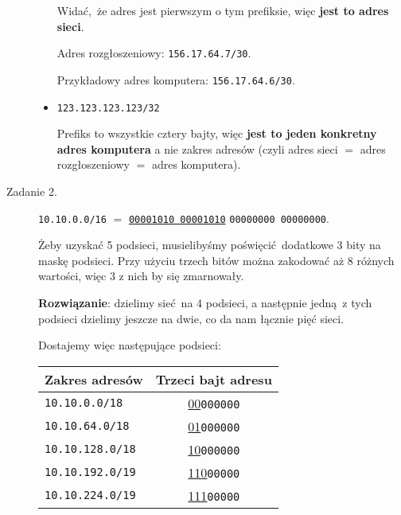 \documentclass[a4paper, oneside]{article}
\begin{document}
\begin{description}
\begin{itemize}
{            Widać, że adres jest pierwszym o tym prefiksie, więc 
            \textbf{jest to adres sieci}.

            Adres rozgłoszeniowy: \texttt{156.17.64.7/30}.

            Przykładowy adres komputera: \texttt{156.17.64.6/30}.
        }

        \item {
            \texttt{123.123.123.123/32}

            Prefiks to wszystkie cztery bajty, więc 
            \textbf{jest to jeden konkretny adres komputera} a nie zakres 
            adresów (czyli adres sieci $=$ adres rozgłoszeniowy $=$ 
            adres komputera).
        }

    \end{itemize}
    \item[Zadanie 2.] {
        \texttt{10.10.0.0/16} $=$ 
        \underline{\texttt{00001010 00001010}} \texttt{00000000 00000000}.

        Żeby uzyskać 5 podsieci, musielibyśmy poświęcić dodatkowe 3 bity na 
        maskę podsieci. Przy użyciu trzech bitów można zakodować aż 8 różnych 
        wartości, więc 3 z nich by się zmarnowały.

        \textbf{Rozwiązanie}: dzielimy sieć na 4 podsieci, a 
        następnie jedną z tych podsieci dzielimy jeszcze na dwie, co da nam 
        łącznie pięć sieci.

        Dostajemy więc następujące podsieci:
        \begin{table}[H]
        \centering
        \begin{tabular}{|l|c|}
            \hline
            \textbf{Zakres adresów} & \textbf{Trzeci bajt adresu} \\\hline\hline
            \texttt{10.10.0.0/18}   & \underline{00}\texttt{000000} \\ \hline
            \texttt{10.10.64.0/18}  & \underline{01}\texttt{000000} \\ \hline
            \texttt{10.10.128.0/18} & \underline{10}\texttt{000000} \\ \hline
            \texttt{10.10.192.0/19} & \underline{110}\texttt{00000} \\ \hline
            \texttt{10.10.224.0/19} & \underline{111}\texttt{00000} \\ \hline
        \end{tabular}
        \end{table}

}
\end{description}
\end{document}
